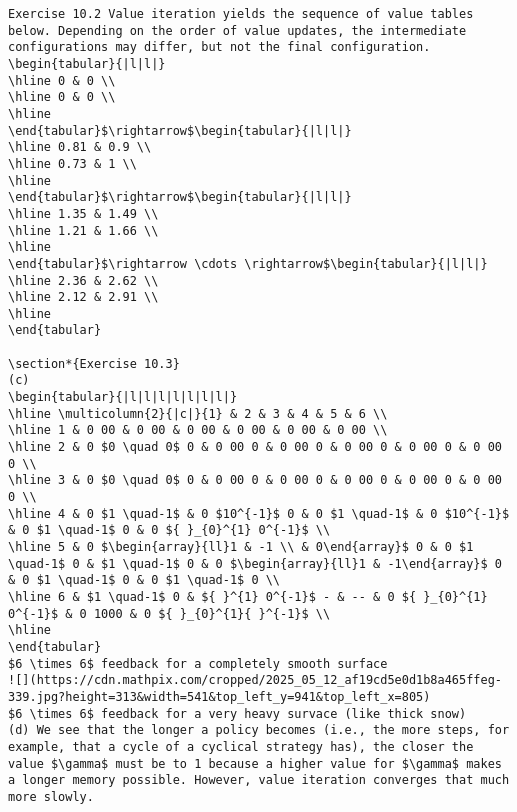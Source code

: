 \documentclass[10pt]{article}
\begin{document}
\begin{verbatim}
Exercise 10.2 Value iteration yields the sequence of value tables below. Depending on the order of value updates, the intermediate configurations may differ, but not the final configuration.
\begin{tabular}{|l|l|}
\hline 0 & 0 \\
\hline 0 & 0 \\
\hline
\end{tabular}$\rightarrow$\begin{tabular}{|l|l|}
\hline 0.81 & 0.9 \\
\hline 0.73 & 1 \\
\hline
\end{tabular}$\rightarrow$\begin{tabular}{|l|l|}
\hline 1.35 & 1.49 \\
\hline 1.21 & 1.66 \\
\hline
\end{tabular}$\rightarrow \cdots \rightarrow$\begin{tabular}{|l|l|}
\hline 2.36 & 2.62 \\
\hline 2.12 & 2.91 \\
\hline
\end{tabular}

\section*{Exercise 10.3}
(c)
\begin{tabular}{|l|l|l|l|l|l|l|}
\hline \multicolumn{2}{|c|}{1} & 2 & 3 & 4 & 5 & 6 \\
\hline 1 & 0 00 & 0 00 & 0 00 & 0 00 & 0 00 & 0 00 \\
\hline 2 & 0 $0 \quad 0$ 0 & 0 00 0 & 0 00 0 & 0 00 0 & 0 00 0 & 0 00 0 \\
\hline 3 & 0 $0 \quad 0$ 0 & 0 00 0 & 0 00 0 & 0 00 0 & 0 00 0 & 0 00 0 \\
\hline 4 & 0 $1 \quad-1$ & 0 $10^{-1}$ 0 & 0 $1 \quad-1$ & 0 $10^{-1}$ & 0 $1 \quad-1$ 0 & 0 ${ }_{0}^{1} 0^{-1}$ \\
\hline 5 & 0 $\begin{array}{ll}1 & -1 \\ & 0\end{array}$ 0 & 0 $1 \quad-1$ 0 & $1 \quad-1$ 0 & 0 $\begin{array}{ll}1 & -1\end{array}$ 0 & 0 $1 \quad-1$ 0 & 0 $1 \quad-1$ 0 \\
\hline 6 & $1 \quad-1$ 0 & ${ }^{1} 0^{-1}$ - & -- & 0 ${ }_{0}^{1} 0^{-1}$ & 0 1000 & 0 ${ }_{0}^{1}{ }^{-1}$ \\
\hline
\end{tabular}
$6 \times 6$ feedback for a completely smooth surface
![](https://cdn.mathpix.com/cropped/2025_05_12_af19cd5e0d1b8a465ffeg-339.jpg?height=313&width=541&top_left_y=941&top_left_x=805)
$6 \times 6$ feedback for a very heavy survace (like thick snow)
(d) We see that the longer a policy becomes (i.e., the more steps, for example, that a cycle of a cyclical strategy has), the closer the value $\gamma$ must be to 1 because a higher value for $\gamma$ makes a longer memory possible. However, value iteration converges that much more slowly.


\end{verbatim}
\end{document}
